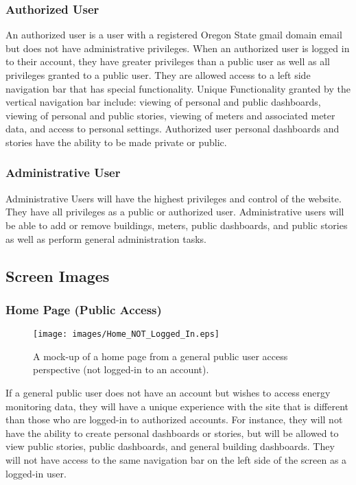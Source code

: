 \documentclass[journal,10pt,onecolumn,compsoc]{IEEEtran}
\begin{document}
	\subsubsection{Authorized User}
	An authorized user is a user with a registered Oregon State gmail domain email but does not have administrative privileges. When an authorized user is logged in 
	to their account, they have greater privileges than a public user as well as all privileges granted to a public user. They are allowed access to a left side navigation 
	bar that has special functionality. Unique Functionality granted by the vertical navigation bar include: viewing of personal and public dashboards, viewing of personal and public
	stories, viewing of meters and associated meter data, and access to personal settings. Authorized user personal dashboards and stories have the ability to be made private or public.
	
	\subsubsection{Administrative User}
	Administrative Users will have the highest privileges and control of the website. They have all privileges as a public or authorized user. Administrative users
	will be able to add or remove buildings, meters, public dashboards, and public stories as well as perform general administration tasks.
	
	
    \subsection{Screen Images}
    \iffalse
    Display screenshots showing the interface from the user’s perspective. These can be
    hand drawn or you can use an automated drawing tool. Just make them as accurate
    as possible. (Graph paper works well.) 
    \fi 
	
	\subsubsection{Home Page (Public Access)}
    \begin{figure}[H]
        \centering
        \texttt{[image: images/Home\_NOT\_Logged\_In.eps]}
        \caption{A mock-up of a home page from a general public user access perspective (not logged-in to an account).}
    \end{figure}
	If a general public user does not have an account but wishes to access energy monitoring data, they will
	have a unique experience with the site that is different than those who are logged-in to authorized accounts. 
	For instance, they will not have the ability to create personal dashboards or stories, but will be allowed to view
	public stories, public dashboards, and general building dashboards. They will not have access to the same navigation 
	bar on the left side of the screen as a logged-in user. 
	
\end{document}
